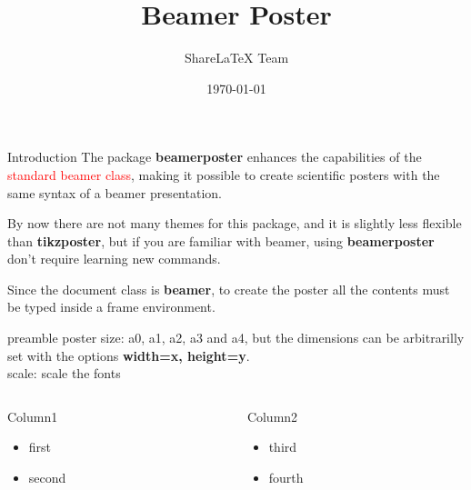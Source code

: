 \documentclass{beamer}
\title{Beamer Poster}
\author{ShareLaTeX Team}
\institute{ShareLaTeX Ins.}
\date{\today}
\begin{document}
\begin{frame}{}
    \maketitle
    \vfill
    \begin{block}{Introduction}
	The package \textbf{beamerposter} enhances the capabilities of 
	the \textcolor{red}{standard beamer class}, making it possible
	to create scientific posters with the same syntax of a beamer 
	presentation.

	By now there are not many themes for this package, and it is
	slightly less flexible than \textbf{tikzposter}, but if you
	are familiar with beamer, using \textbf{beamerposter} don't
	require learning new commands.
    \end{block}
    \begin{block}{}
	Since the document class is \textbf{beamer}, to create the poster
	all the contents must be typed inside a frame environment.
    \end{block}
    \begin{block}{preamble}
	poster size: a0, a1, a2, a3 and a4, but the dimensions can be 
	arbitrarilly set with the options \textcolor{RawSienna}{\textbf{width=x, height=y}}. \\
	scale: scale the fonts
    \end{block}
    \begin{columns}[t]
	\begin{column}{0.35\linewidth}
	    \begin{block}{Column1}
		\begin{itemize}
		    \item first
		    \item second
		\end{itemize}
	    \end{block}
	\end{column}
	\begin{column}{0.55\linewidth}
	    \begin{block}{Column2}
		\begin{itemize}
		    \item third
		    \item fourth
		\end{itemize}
	    \end{block}
	\end{column}
    \end{columns}
\end{frame}
\end{document}

